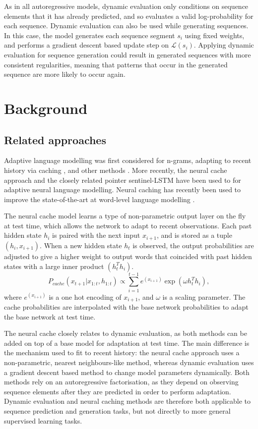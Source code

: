 \documentclass{article} %
\begin{document}
As in all autoregressive models, dynamic evaluation only conditions on sequence elements that it has already predicted, and so evaluates a valid log-probability for each sequence. Dynamic evaluation can also be used while generating sequences. In this case, the model generates each sequence segment $s_i$ using fixed weights, and performs a gradient descent based update step on $\mathcal{L}(s_i)$. Applying dynamic evaluation for sequence generation could result in generated sequences with more consistent regularities, meaning that patterns that occur in the generated sequence are more likely to occur again.


\section{Background}

\subsection{Related approaches}

Adaptive language modelling was first considered for n-grams, adapting to recent history via caching \citep{jelinek1991,kuhn1988}, and other methods \citet{bellegarda2004adaptation}. More recently, the neural cache approach \citep{grave2017} and the closely related pointer sentinel-LSTM \citep{Merity2016} have been used to for adaptive neural language modelling. Neural caching has recently been used to improve the state-of-the-art at word-level language modelling \citep{merity2017}.

The neural cache model learns a type of non-parametric output layer on the fly at test time, which allows the network to adapt to recent observations. Each past hidden state $h_i$ is paired with the next input $x_{i+1}$, and is stored as a tuple $(h_i,x_{i+1})$. When a new hidden state $h_t$ is observed, the output probabilities are adjusted to give a higher weight to output words that coincided with past hidden states with a large inner product $(h_t^T h_i)$. 
\begin{equation}
P_{cache}(x_{t+1}|x_{1:t},h_{1:t})  \propto \sum^{t-1}_{i=1} e^{(x_{i+1})} \exp(\omega h_t^T h_i),
\end{equation}
where $e^{(x_{i+1})}$ is a one hot encoding of $x_{i+1}$, and $\omega$ is a scaling parameter. The cache probabilities are interpolated with the base network probabilities to adapt the base network at test time.

The neural cache closely relates to dynamic evaluation, as both methods can be added on top of a base model for adaptation at test time. The main difference is the mechanism used to fit to recent history: the neural cache approach uses a non-parametric, nearest neighbours-like method, whereas dynamic evaluation uses a gradient descent based method to change model parameters dynamically. Both methods rely on an autoregressive factorisation, as they depend on observing sequence elements after they are predicted in order to perform adaptation. Dynamic evaluation and neural caching methods are therefore both applicable to sequence prediction and generation tasks, but not directly to more general supervised learning tasks.
\end{document}
